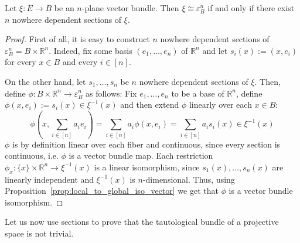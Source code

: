 \begin{lemma}\label{lem:n_sections_makes_trivial} Let $\xi:E\to B$ be an $n$-plane vector bundle. Then $\xi\cong\varepsilon_B^n$ if and only if there exist $n$ nowhere dependent sections of $\xi$.
\end{lemma}
\begin{proof} First of all, it is easy to construct $n$ nowhere dependent sections of $\varepsilon_B^n=B\times\mathbb{R}^n$. Indeed, fix some basis $(e_1,\ldots,e_n)$ of $\mathbb{R}^n$ and let $s_i(x):=(x,e_i)$ for every $x\in B$ and every $i\in[n]$.

On the other hand, let $s_1,\ldots,s_n$ be $n$ nowhere dependent sections of $\xi$. Then, define $\phi:B\times\mathbb{R}^n\to\varepsilon_B^n$ as follows: Fix $e_1,\ldots,e_n$ to be a base of $\mathbb{R}^n$, define $\phi(x,e_i):=s_i(x)\in\xi^{-1}(x)$ and then extend $\phi$ linearly over each $x\in B$:
\[\phi\left(x,\sum_{i\in[n]}a_ie_i\right)=\sum_{i\in[n]}a_i\phi(x,e_i)=\sum_{i\in[n]}a_is_i(x)\in\xi^{-1}(x)\]
$\phi$ is by definition linear over each fiber and continuous, since every section is continuous, i.e. $\phi$ is a vector bundle map. Each restriction $\phi_x:\{x\}\times\mathbb{R}^n\to\xi^{-1}(x)$ is a linear isomorphism, since $s_1(x),\ldots,s_n(x)$ are linearly independent and $\xi^{-1}(x)$ is $n$-dimensional. Thus, using Proposition~\ref{prop:local_to_global_iso_vector} we get that $\phi$ is a vector bundle isomorphism.
\end{proof}

Let us now use sections to prove that the tautological bundle of a projective space is not trivial.

